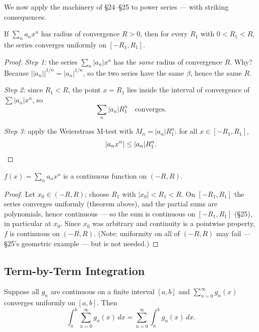 \documentclass[11pt]{report}
\begin{document}
We now apply the machinery of \S 24--\S 25 to power series --- with striking consequences.

\begin{thmbox}
If $\sum_n a_n x^n$ has radius of convergence $R > 0$, then for every $R_1$ with $0 < R_1 < R$, the series converges uniformly on $[-R_1, R_1]$.
\end{thmbox}

\begin{proof}
\emph{Step 1:} the series $\sum_n |a_n| x^n$ has the \emph{same} radius of convergence $R$. Why? Because $\bigl||a_n|\bigr|^{1/n} = |a_n|^{1/n}$, so the two series have the same $\beta$, hence the same $R$.

\emph{Step 2:} since $R_1 < R$, the point $x = R_1$ lies inside the interval of convergence of $\sum |a_n| x^n$, so
\[
\sum_n |a_n| R_1^n \quad \text{converges}.
\]

\emph{Step 3:} apply the Weierstrass M-test with $M_n = |a_n| R_1^n$: for all $x \in [-R_1, R_1]$,
\[
|a_n x^n| \leq |a_n| R_1^n. \qedhere
\]
\end{proof}

\begin{corbox}
$f(x) = \sum_n a_n x^n$ is a continuous function on $(-R, R)$.
\end{corbox}

\begin{proof}
Let $x_0 \in (-R, R)$; choose $R_1$ with $|x_0| < R_1 < R$. On $[-R_1, R_1]$ the series converges uniformly (theorem above), and the partial sums are polynomials, hence continuous --- so the sum is continuous on $[-R_1, R_1]$ (\S 25), in particular at $x_0$. Since $x_0$ was arbitrary and continuity is a pointwise property, $f$ is continuous on $(-R,R)$. (Note: uniformity on all of $(-R,R)$ may fail --- \S 25's geometric example --- but is not needed.)
\end{proof}

\subsection{Term-by-Term Integration}

\begin{thmbox}
Suppose all $g_n$ are continuous on a finite interval $[a,b]$ and $\sum_{n=0}^\infty g_n(x)$ converges uniformly on $[a,b]$. Then
\[
\int_a^b \sum_{n=0}^\infty g_n(x)\,dx = \sum_{n=0}^\infty \int_a^b g_n(x)\,dx.
\]
\end{thmbox}
\end{document}
